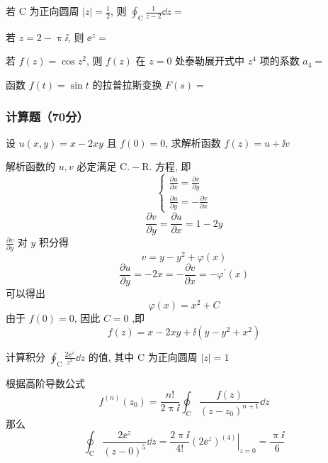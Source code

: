 \begin{ti}
	若 $\mathrm{C}$ 为正向圆周 $|z|=\frac{1}{2}$, 则 $\oint_{\mathrm{C}} \frac{1}{z-2} \dd z=$ 
\end{ti}

\begin{ti}
	若 $z=2-\uppi\ii$, 则 $\ee^{z}=$ 
\end{ti}

\begin{ti}
	若 $f(z)=\cos z^2$, 则 $f(z)$ 在 $z=0$ 处泰勒展开式中 $z^4$ 项的系数 $a_4=$ 
\end{ti}

\begin{ti}
	函数 $f(t)=\sin t$ 的拉普拉斯变换 $F(s)=$ 
\end{ti}

\subsubsection{计算题（70分）}
\begin{ti}[$10$ 分]
	设 $u(x,y)=x-2xy$ 且 $f(0)=0$, 求解析函数 $f(z)=u+\ii v$
	\begin{solution}
		解析函数的 $u,v$ 必定满足 $\mathrm{C}.-\mathrm{R}.$ 方程, 即
		\begin{equation*}
			\begin{cases}
			\frac{\partial u}{\partial x}=\frac{\partial v}{\partial y}\\
			\frac{\partial u}{\partial y}=-\frac{\partial v}{\partial x}
			\end{cases}
		\end{equation*}
		\[
			\frac{\partial v}{\partial y}=\frac{\partial u}{\partial x}=1-2 y
		\]
		$\frac{\partial v}{\partial y}$ 对 $y$ 积分得
		\[
			v=y-y^{2}+\varphi(x)
		\]
		\[
			\frac{\partial u}{\partial y}=-2 x=-\frac{\partial v}{\partial x}=-\varphi^{\prime}(x)
		\]
		可以得出
		\[
			\varphi(x)=x^{2}+C
		\]
		由于 $f(0)=0$, 因此 $C=0$ ,即
		\[
			f(z)=x-2 x y+\ii\left(y-y^{2}+x^{2}\right)
		\]
	\end{solution}
\end{ti}

\begin{ti}[$7$ 分]
	计算积分 $\oint_{\mathrm{C}}\frac{2\ee^x}{z^5}\dd z$ 的值, 其中 $\mathrm{C}$ 为正向圆周 $|z|=1$
	\begin{solution}
		根据高阶导数公式
		\[
			f^{(n)}(z_0)=\frac{n!}{2\uppi\ii}\oint_{\mathrm{C}}\frac{f(z)}{(z-z_0)^{n+1}}\dd z
		\]
		那么
		\begin{equation*}
			\oint_{\mathrm{C}} \frac{2 \ee^{z}}{(z-0)^{5}} \dd z=\frac{2 \uppi \ii}{4 !}\left.\left(2 \ee^{z}\right)^{(4)}\right|_{z=0}=\frac{\uppi \ii}{6}
		\end{equation*}
	\end{solution}
\end{ti}

